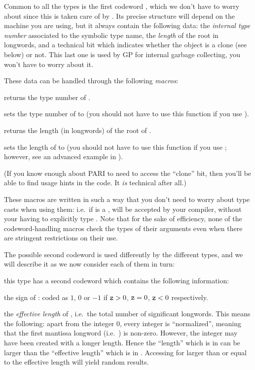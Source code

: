 Common to all the types is the
first codeword , which we don't have to worry about since this is
taken care of by . Its precise structure will depend on the
machine you are using, but it always contain the following data: the
\emph{internal type number} associated to the symbolic type
name, the \emph{length} of the root in longwords, and a technical bit
which indicates whether the object is a clone (see below) or not. This last
one is used by GP for internal garbage collecting, you won't have to worry
about it.

\noindent These data can be handled through the following \emph{macros}:

 returns the type number of .

 sets the type number of  to
 (you should not have to use this function if you use ).

 returns the length (in longwords) of the root of .

 sets the length of  to  (you
should not have to use this function if you use ; however, see
an advanced example in ).

\noindent
(If you know enough about PARI to need to access the ``clone'' bit, then
you'll be able to find usage hints in the code. It \emph{is} technical after
all.)

These macros are written in such a way that you don't need to worry about
type casts when using them: i.e.~if  is a , 
will be accepted by your compiler, without your having to explicitly type
. Note that for the sake of efficiency, none of the
codeword-handling macros check the types of their arguments even when there
are stringent restrictions on their use.

The possible second codeword is used differently by the different types, and
we will describe it as we now consider each of them in turn:


 this type has
a second codeword  which contains the following information:

the sign of : coded as $1$, $0$ or $-1$ if ${\tt z} > 0$, ${\tt z} = 0$,
${\tt z} < 0$ respectively.

the \emph{effective length} of , i.e.~the total number of significant
longwords. This means the following: apart from the integer 0, every integer
is ``normalized'', meaning that the first mantissa longword (i.e.~)
is non-zero. However, the integer may have been created with a longer length.
Hence the ``length'' which is in  can be larger than the
``effective length'' which is in . Accessing  for 
larger than or equal to the effective length will yield random results.

